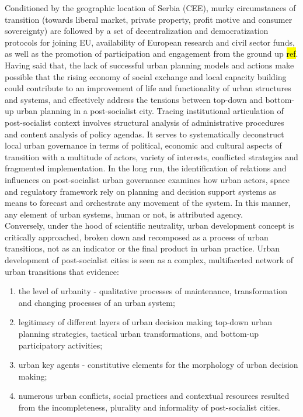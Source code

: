 \documentclass[11pt]{report}
\begin{document}
Conditioned by the geographic location of Serbia (CEE), murky circumstances of transition (towards liberal market, private property, profit motive and consumer sovereignty) are followed by a set of decentralization and democratization protocols for joining EU, availability of European research and civil sector funds, as well as the promotion of participation and engagement from the ground up \hl{ref}. Having said that, the lack of successful urban planning models and actions make possible that the rising economy of social exchange and local capacity building could contribute to an improvement of life and functionality of urban structures and systems, and effectively address the tensions between top-down and bottom-up urban planning in a post-socialist city. Tracing institutional articulation of post-socialist context involves structural analysis of administrative procedures and content analysis of policy agendas. It serves to systematically deconstruct local urban governance in terms of political, economic and cultural aspects of transition with a multitude of actors, variety of interests, conflicted strategies and fragmented implementation. In the long run, the identification of relations and influences on post-socialist urban governance examines how urban actors, space and regulatory framework rely on planning and decision support systems as means to forecast and orchestrate any movement of the system. In this manner, any element of urban systems, human or not, is attributed agency.
\\
Conversely, under the hood of scientific neutrality, urban development concept is critically approached, broken down and recomposed as a process of urban transitions, not as an indicator or the final product in urban practice. Urban development of post-socialist cities is seen as a complex, multifaceted network of urban transitions that evidence: 
\begin{enumerate}
\item the level of urbanity - qualitative processes of maintenance, transformation and changing processes of an urban system;
\item legitimacy of different layers of urban decision making top-down urban planning strategies, tactical urban transformations, and bottom-up participatory activities;
\item urban key agents - constitutive elements for the morphology of urban decision making;
\item numerous urban conflicts, social practices and contextual resources resulted from the incompleteness, plurality and informality of post-socialist cities.
\end{enumerate}  
\end{document}
